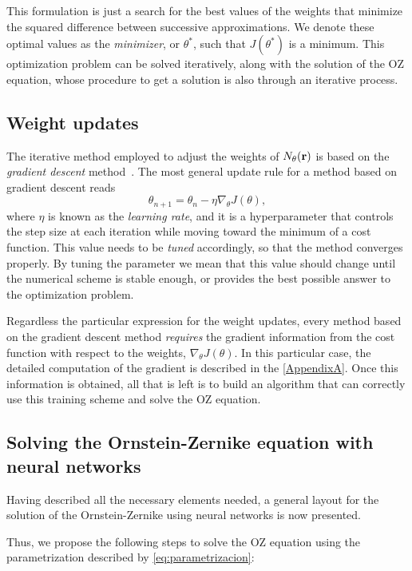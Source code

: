 This formulation is just a search for the best values of the weights that minimize
the squared difference between successive approximations. We denote these optimal values
as the \emph{minimizer}, or $\theta^{*}$, such that $J(\theta^{*})$ is a minimum.
This optimization problem can be solved iteratively, along with the solution of the
OZ equation, whose procedure to get a solution is also through an iterative process.

\subsection{Weight updates}
The iterative method employed to adjust the weights of $N_{\theta}(\mathbf{r})$ is based on the
\emph{gradient descent} method~\cite{nocedalNumericalOptimization2006}.
The most general update rule for a method based on gradient descent reads~\cite{goodfellowDeepLearning2016}
\begin{equation}
    \theta_{n+1} = \theta_n - \eta \nabla_{\theta} J(\theta) ,
    \label{eq:gradiente}
\end{equation}
where $\eta$ is known as the \emph{learning rate}, and it is a hyperparameter
that controls the step size at each iteration while moving toward the minimum
of a cost function. This value needs to be \emph{tuned} accordingly, so
that the method converges properly. By tuning the parameter we mean that this value
should change until the numerical scheme is stable enough, or provides the best
possible answer to the optimization problem.

Regardless the particular expression for the weight updates, every method
based on the gradient descent method \emph{requires} the gradient information from
the cost function with respect to the weights, $\nabla_{\theta} J(\theta)$.
In this particular case, the detailed computation of the gradient is described in
the \autoref{AppendixA}.
Once this information is obtained, all that is left is to build an algorithm that
can correctly use this training scheme and solve the OZ equation.

\subsection{Solving the Ornstein-Zernike equation with neural networks}
Having described all the necessary elements needed, a general layout for the solution
of the Ornstein-Zernike using neural networks is now presented.

Thus, we propose the following steps to solve the OZ equation using the parametrization
described by \autoref{eq:parametrizacion}:

